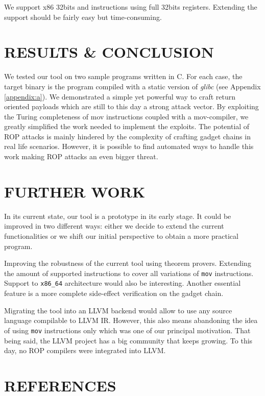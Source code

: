 \documentclass[10pt,twocolumn]{article}
\begin{document}
We support x86 32bits and instructions using full 32bits registers. Extending
the support should be fairly easy but time-consuming.


\section{RESULTS \& CONCLUSION}
  We tested our tool on two sample programs written in C. For each case, the
  target binary is the program compiled with a static version of \textit{glibc}
  (see Appendix \ref{appendix:a}).
  We demonstrated a simple yet powerful way to craft return oriented payloads
  which are still to this day a strong attack vector. By exploiting the Turing
  completeness of mov instructions coupled with a mov-compiler, we greatly
  simplified the work needed to implement the exploits. The potential of ROP
  attacks is mainly hindered by the complexity of crafting gadget chains in real
  life scenarios. However, it is possible to find automated ways to handle this
  work making ROP attacks an even bigger threat.

\section{FURTHER WORK}

In its current state, our tool is a prototype in its early stage. It could be
improved in two different ways: either we decide to extend the current
functionalities or we shift our initial perspective to obtain a more practical
program.

Improving the robustness of the current tool using theorem provers. Extending
the amount of supported instructions to cover all variations of \texttt{mov}
instructions. Support to \texttt{x86\_64} architecture would also be
interesting. Another essential feature is a more complete side-effect
verification on the gadget chain.

Migrating the tool into an LLVM backend would allow to use any source language
compilable to LLVM IR. However, this also means abandoning the idea of using
\texttt{mov} instructions only which was one of our principal motivation. That
being said, the LLVM project has a big community that keeps growing. To this
day, no ROP compilers were integrated into LLVM.


\section{REFERENCES}
\begingroup
\renewcommand{\section}[2]{}

\small
\endgroup
\end{document}
